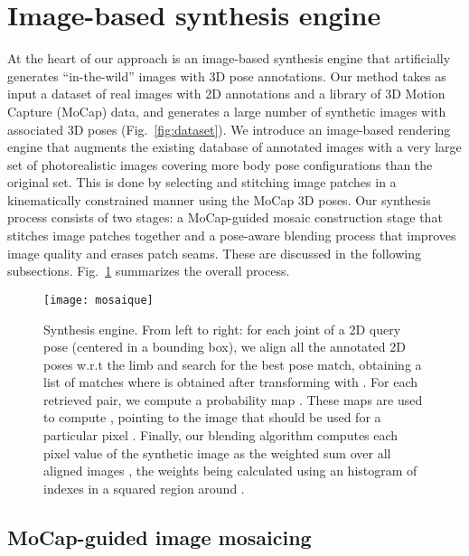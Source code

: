 \documentclass{article}
\begin{document}
 \section{Image-based synthesis engine}
  
 At the heart of our approach is an image-based synthesis engine that
 artificially generates ``in-the-wild'' images  with 3D pose
 annotations. Our method takes as input a dataset of real images with 2D
 annotations and a library of 3D Motion Capture (MoCap)
 data, and generates a large number of synthetic images with associated
 3D poses (Fig.~\ref{fig:dataset}). 
We introduce an image-based rendering engine that augments the
existing database of annotated images with a very large set of
photorealistic images covering more body pose configurations
than the original set. This is done by selecting and stitching image
patches in a kinematically constrained manner using the MoCap 3D
poses. 
Our synthesis process consists
 of two stages:  a MoCap-guided mosaic construction stage that stitches image
 patches together and a pose-aware blending  process that improves image quality and erases  patch seams. These are discussed in the following subsections. 
 Fig.~\ref{fig:mosaique} summarizes the overall process. 
\begin{figure}[t]
  \centering
   \hspace{-0mm}\texttt{[image: mosaique]}
     \vspace{-5mm} \caption{\footnotesize Synthesis engine. From left to right:  for each joint  of a 2D query pose  (centered in a   bounding box), we align all the annotated 2D poses w.r.t the limb and search for the best pose match, obtaining a list of  matches  where  is obtained after transforming  with . For each retrieved pair, we compute a probability map . These  maps are used to compute  , pointing to the image  that should be used for a particular pixel . Finally, our blending algorithm computes each pixel value of the synthetic image  as the weighted sum over all aligned images , the weights being calculated using an histogram of indexes in a squared region  around  .}
\label{fig:mosaique}
\end{figure}







 \subsection{MoCap-guided image mosaicing}
\end{document}
